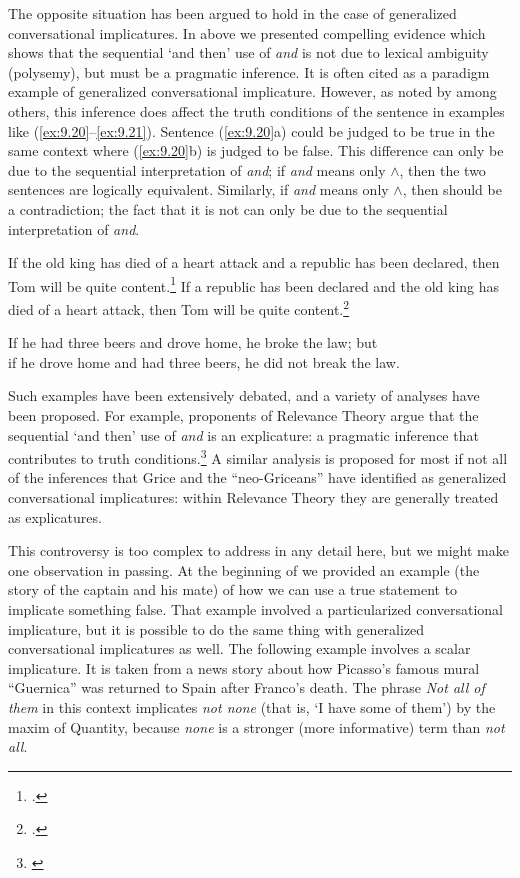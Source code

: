 The opposite situation has been argued to hold in the case of generalized conversational implicatures. In  above we presented compelling evidence which shows that the sequential ‘and then’ use of \textit{and} is not due to lexical ambiguity (polysemy), but must be a pragmatic inference. It is often cited as a paradigm example of generalized conversational implicature. However, as noted by \citet{Levinson1995,Levinson2000} among others, this inference does affect the truth conditions of the sentence in examples like (\ref{ex:9.20}--\ref{ex:9.21}). Sentence (\ref{ex:9.20}a) could be judged to be true in the same context where (\ref{ex:9.20}b) is judged to be false. This difference can only be due to the sequential interpretation of \textit{and}; if \textit{and} means only $\wedge$, then the two sentences are logically equivalent. Similarly, if \textit{and} means only $\wedge$, then  should be a contradiction; the fact that it is not can only be due to the sequential interpretation of \textit{and}.


\ea \label{ex:9.20}
\ea  If the old king has died of a heart attack and a republic has been declared, then Tom will be quite content.\footnote{\citet[58]{Cohen1971}.}
\ex  If a republic has been declared and the old king has died of a heart attack, then Tom will be quite content.\footnote{\citet[69]{Gazdar1979}.}
\z \z

\ea \label{ex:9.21}
If he had three beers and drove home, he broke the law; but\\
if he drove home and had three beers, he did not break the law.
\z


Such examples have been extensively debated, and a variety of analyses have been proposed. For example, proponents of Relevance Theory argue that the sequential ‘and then’ use of \textit{and} is an explicature: a pragmatic inference that contributes to truth conditions.\footnote{\citet{Carston1988,Carston2004}} A similar analysis is proposed for most if not all of the inferences that Grice and the “neo-Griceans” have identified as generalized conversational implicatures: within Relevance Theory they are generally treated as explicatures.



This controversy is too complex to address in any detail here, but we might make one observation in passing. At the beginning of  we provided an example (the story of the captain and his mate) of how we can use a true statement to implicate something false. That example involved a particularized conversational implicature, but it is possible to do the same thing with generalized conversational implicatures as well. The following example involves a scalar implicature. It is taken from a news story about how Picasso’s famous mural “Guernica” was returned to Spain after Franco’s death. The phrase \textit{Not all of them} in this context implicates \textit{not none} (that is, ‘I have some of them’) by the maxim of Quantity, because \textit{none} is a stronger (more informative) term than \textit{not all}.


